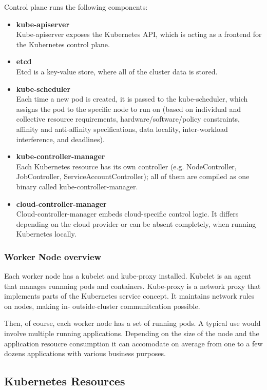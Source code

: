 Control plane runs the following components: 
\begin{itemize}
\item \textbf{kube-apiserver} \\
Kube-apiserver exposes the Kubernetes API, which is acting as a frontend for the Kubernetes control plane.
\item \textbf{etcd} \\
Etcd is a key-value store, where all of the cluster data is stored.
\item \textbf{kube-scheduler} \\
Each time a new pod is created, it is passed to the kube-scheduler, which assigns the pod to the specific node to run on (based on individual and collective resource requirements, hardware/software/policy constraints, affinity and anti-affinity specifications, data locality, inter-workload interference, and deadlines).
\item \textbf{kube-controller-manager} \\
Each Kubernetes resource has its own controller (e.g. NodeController, JobController, ServiceAccountController); all of them are compiled as one binary called kube-controller-manager.
\item \textbf{cloud-controller-manager} \\
Cloud-controller-manager embeds cloud-specific control logic. It differs depending on the cloud provider or can be absent completely, when running Kubernetes locally.
\end{itemize}

\subsubsection*{Worker Node overview}

Each worker node has a kubelet and kube-proxy installed. Kubelet is an agent that manages runnning pods and containers. Kube-proxy is a network proxy that implements parts of the Kubernetes service concept. It maintains network rules on nodes, making in- outside-cluster communitcation possible.

Then, of course, each worker node has a set of running pods. A typical use would involve multiple running applications. Depending on the size of the node and the application resoucre consumption it can accomodate on average from one to a few dozens applications with various business purposes.

\subsection{Kubernetes Resources}

